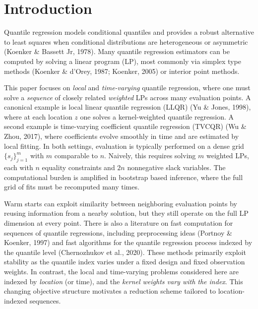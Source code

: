 \documentclass[lineno]{biometrika}
\begin{document}
\section{Introduction}\label{sec:intro}

Quantile regression models conditional quantiles and provides a robust alternative to least squares
when conditional distributions are heterogeneous or asymmetric (Koenker \& Bassett Jr, 1978).
Many quantile regression estimators can be computed by solving a linear program (LP), most commonly
via simplex type methods (Koenker \& d'Orey, 1987; Koenker, 2005) or interior point methods.

This paper focuses on \emph{local} and \emph{time-varying} quantile regression, where one must solve a
\emph{sequence} of closely related \emph{weighted} LPs across many evaluation points.
A canonical example is local linear quantile regression (LLQR) (Yu \& Jones, 1998), where at each location
$z$ one solves a kernel-weighted quantile regression. A second example is time-varying coefficient quantile
regression (TVCQR) (Wu \& Zhou, 2017), where coefficients evolve smoothly in time and are estimated by local
fitting. In both settings, evaluation is typically performed on a dense grid $\{s_j\}_{j=1}^m$ with $m$ comparable
to $n$. Naively, this requires solving $m$ weighted LPs, each with $n$ equality constraints and $2n$ nonnegative
slack variables. The computational burden is amplified in bootstrap based inference, where the full grid of fits
must be recomputed many times.

Warm starts can exploit similarity between neighboring evaluation points by reusing information from a nearby
solution, but they still operate on the full LP dimension at every point. There is also a literature on fast
computation for sequences of quantile regressions, including preprocessing ideas (Portnoy \& Koenker, 1997)
and fast algorithms for the quantile regression process indexed by the quantile level (Chernozhukov et al., 2020).
These methods primarily exploit stability as the quantile index varies under a fixed design and fixed observation
weights. In contrast, the local and time-varying problems considered here are indexed by \emph{location} (or time),
and the \emph{kernel weights vary with the index}. This changing objective structure motivates a reduction scheme
tailored to location-indexed sequences.
\end{document}
